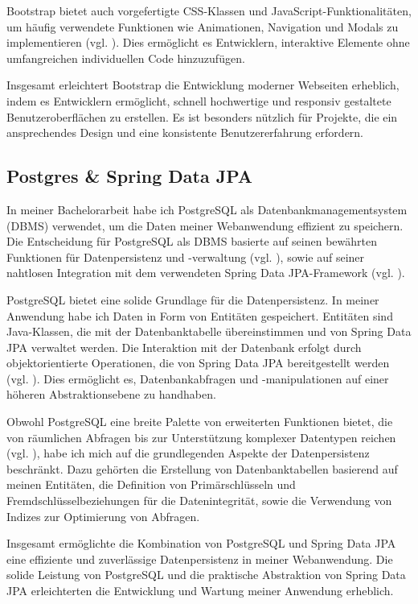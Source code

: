 \documentclass[fontsize=12pt,openright,oneside,paper=a4,BCOR=1cm]{scrbook}
\begin{document}
Bootstrap bietet auch vorgefertigte CSS-Klassen und JavaScript-Funktionalitäten, um häufig verwendete Funktionen wie Animationen, Navigation und Modals zu implementieren (vgl. \cite{bootstrapjs}). Dies ermöglicht es Entwicklern, interaktive Elemente ohne umfangreichen individuellen Code hinzuzufügen.

Insgesamt erleichtert Bootstrap die Entwicklung moderner Webseiten erheblich, indem es Entwicklern ermöglicht, schnell hochwertige und responsiv gestaltete Benutzeroberflächen zu erstellen. Es ist besonders nützlich für Projekte, die ein ansprechendes Design und eine konsistente Benutzererfahrung erfordern.

\subsection{Postgres \& Spring Data JPA}

In meiner Bachelorarbeit habe ich PostgreSQL als Datenbankmanagementsystem (DBMS) verwendet, um die Daten meiner Webanwendung effizient zu speichern. Die Entscheidung für PostgreSQL als DBMS basierte auf seinen bewährten Funktionen für Datenpersistenz und -verwaltung (vgl. \cite{postgres}), sowie auf seiner nahtlosen Integration mit dem verwendeten Spring Data JPA-Framework (vgl. \cite{springdatajpa}).

PostgreSQL bietet eine solide Grundlage für die Datenpersistenz. In meiner Anwendung habe ich Daten in Form von Entitäten gespeichert. Entitäten sind Java-Klassen, die mit der Datenbanktabelle übereinstimmen und von Spring Data JPA verwaltet werden. Die Interaktion mit der Datenbank erfolgt durch objektorientierte Operationen, die von Spring Data JPA bereitgestellt werden (vgl. \cite{springdatajpaentities}). Dies ermöglicht es, Datenbankabfragen und -manipulationen auf einer höheren Abstraktionsebene zu handhaben.

Obwohl PostgreSQL eine breite Palette von erweiterten Funktionen bietet, die von räumlichen Abfragen bis zur Unterstützung komplexer Datentypen reichen (vgl. \cite{postgres}), habe ich mich auf die grundlegenden Aspekte der Datenpersistenz beschränkt. Dazu gehörten die Erstellung von Datenbanktabellen basierend auf meinen Entitäten, die Definition von Primärschlüsseln und Fremdschlüsselbeziehungen für die Datenintegrität, sowie die Verwendung von Indizes zur Optimierung von Abfragen.

Insgesamt ermöglichte die Kombination von PostgreSQL und Spring Data JPA eine effiziente und zuverlässige Datenpersistenz in meiner Webanwendung. Die solide Leistung von PostgreSQL und die praktische Abstraktion von Spring Data JPA erleichterten die Entwicklung und Wartung meiner Anwendung erheblich.
\end{document}
